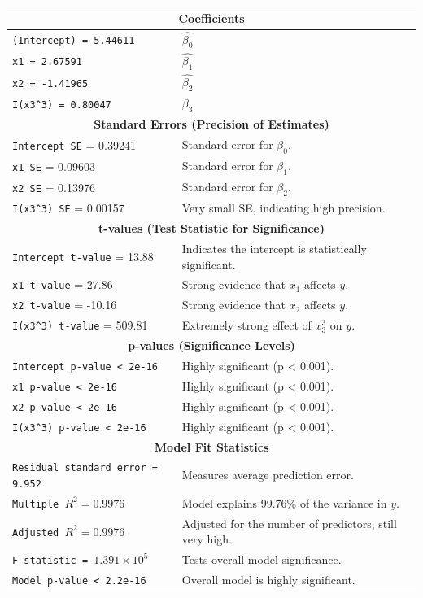 \documentclass[]{article}
\begin{document}
\begin{longtable}{|p{}|p{}|}
	\hline	
	\multicolumn{2}{|c|}{\textbf{Coefficients}} \\
	\hline
	\texttt{(Intercept)  = 5.44611} & $\hat{\beta_0}$\\
	\hline
	\texttt{x1  = 2.67591} & $\hat{\beta_1}$\\
	\hline
	\texttt{x2 = -1.41965} & $\hat{\beta_2}$\\
	\hline
	\texttt{I(x3\textasciicircum3) = 0.80047} & $\beta_3$\\
	\hline
	\multicolumn{2}{|c|}{\textbf{Standard Errors (Precision of Estimates)}} \\
	\hline
	\texttt{Intercept SE} = 0.39241 & Standard error for $\beta_0$. \\
	\hline
	\texttt{x1 SE} = 0.09603 & Standard error for $\beta_1$. \\
	\hline
	\texttt{x2 SE} = 0.13976 & Standard error for $\beta_2$. \\
	\hline
	\texttt{I(x3\textasciicircum3) SE} = 0.00157 & Very small SE, indicating high precision. \\
	\hline
	\multicolumn{2}{|c|}{\textbf{t-values (Test Statistic for Significance)}} \\
	\hline
	\texttt{Intercept t-value} = 13.88 & Indicates the intercept is statistically significant. \\
	\hline
	\texttt{x1 t-value} = 27.86 & Strong evidence that $x_1$ affects $y$. \\
	\hline
	\texttt{x2 t-value} = -10.16 & Strong evidence that $x_2$ affects $y$. \\
	\hline
	\texttt{I(x3\textasciicircum3) t-value} = 509.81 & Extremely strong effect of $x_3^3$ on $y$. \\
	\hline

	\hline
	\multicolumn{2}{|c|}{\textbf{p-values (Significance Levels)}} \\
	\hline
	\texttt{Intercept p-value < 2e-16} & Highly significant (p < 0.001). \\
	\hline
	\texttt{x1 p-value < 2e-16} & Highly significant (p < 0.001). \\
	\hline
	\texttt{x2 p-value < 2e-16} & Highly significant (p < 0.001). \\
	\hline
	\texttt{I(x3\textasciicircum3) p-value < 2e-16} & Highly significant (p < 0.001). \\
	\hline

	\hline
	\multicolumn{2}{|c|}{\textbf{Model Fit Statistics}} \\
	\hline
	\texttt{Residual standard error = 9.952} & Measures average prediction error. \\
	\hline
	\texttt{Multiple $R^2 = 0.9976$} & Model explains 99.76\% of the variance in $y$. \\
	\hline
	\texttt{Adjusted $R^2 = 0.9976$} & Adjusted for the number of predictors, still very high. \\
	\hline
	\texttt{F-statistic = $1.391 \times 10^5$} & Tests overall model significance. \\
	\hline
	\texttt{Model p-value < 2.2e-16} & Overall model is highly significant. \\
	\hline
\end{longtable}
\end{document}
